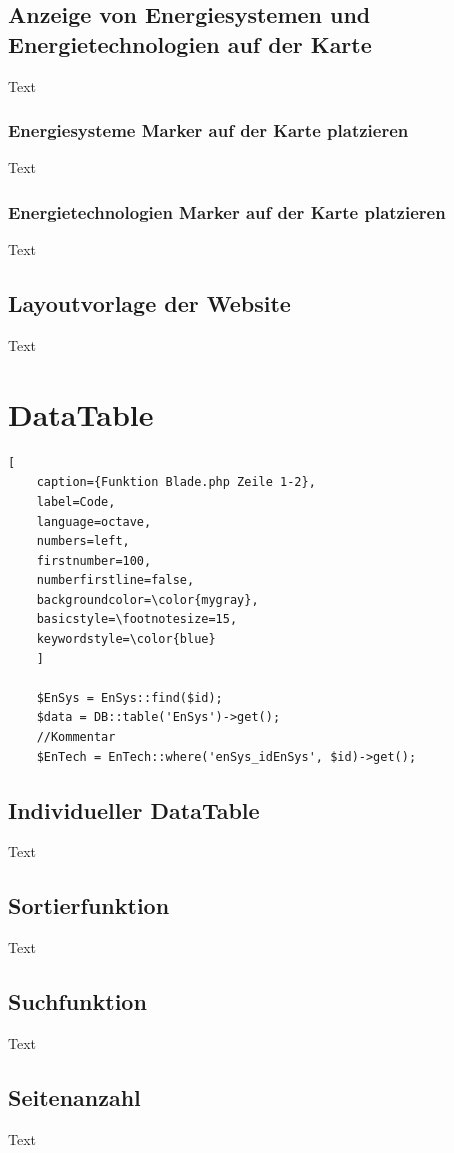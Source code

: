 \subsection{Anzeige von Energiesystemen und Energietechnologien auf der Karte}
Text
\subsubsection{Energiesysteme Marker auf der Karte platzieren}
Text
\subsubsection{Energietechnologien Marker auf der Karte platzieren}
Text

\subsection{Layoutvorlage der Website}
Text



\section{DataTable}
\renewcommand{\lstlistingname}{Quellcode}

\begin{lstlisting}[
	caption={Funktion Blade.php Zeile 1-2},
	label=Code,
	language=octave,
	numbers=left,
	firstnumber=100,
	numberfirstline=false,
	backgroundcolor=\color{mygray},
	basicstyle=\footnotesize=15,
	keywordstyle=\color{blue}
	]
	
	$EnSys = EnSys::find($id);
	$data = DB::table('EnSys')->get();
	//Kommentar
	$EnTech = EnTech::where('enSys_idEnSys', $id)->get();
\end{lstlisting}
\subsection{Individueller DataTable}
Text
\subsection{Sortierfunktion}
Text
\subsection{Suchfunktion}
Text
\subsection{Seitenanzahl}
Text
